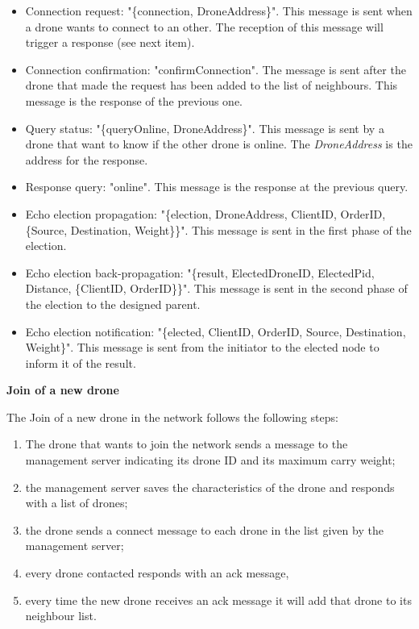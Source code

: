 \documentclass[a4paper, oneside]{memoir}
\begin{document}
\begin{itemize}
	\item Connection request: "\{connection, DroneAddress\}".
	This message is sent when a drone wants to connect to an other. The reception of this message will trigger a response (see next item).

	\item Connection confirmation: "confirmConnection".
	The message is sent after the drone that made the request has been added to the list of neighbours. This message is the response of the previous one.

	\item Query status: "\{queryOnline, DroneAddress\}".
	This message is sent by a drone that want to know if the other drone is online. The \textit{DroneAddress} is the address for the response.

	\item Response query: "online".
	This message is the response at the previous query.

	\item Echo election propagation: "\{election, DroneAddress, ClientID, OrderID, \{Source, Destination, Weight\}\}".
	This message is sent in the first phase of the election.

	\item Echo election back-propagation: "\{result, ElectedDroneID, ElectedPid, Distance, \{ClientID, OrderID\}\}".
	This message is sent in the second phase of the election to the designed parent.

	\item Echo election notification: "\{elected, ClientID, OrderID, Source, Destination, Weight\}".
	This message is sent from the initiator to the elected node to inform it of the result.
\end{itemize}
\newpage


\textbf{Join of a new drone}

The Join of a new drone in the network follows the following steps:
\begin{enumerate}
\item The drone that wants to join the network sends a message to the management server indicating its drone ID and its maximum carry weight;
\item the management server saves the characteristics of the drone and responds with a list of drones;
\item the drone sends a connect message to each drone in the list given by the management server;
\item every drone contacted responds with an ack message,
\item every time the new drone receives an ack message it will add that drone to its neighbour list.
\end{enumerate}
\end{document}
